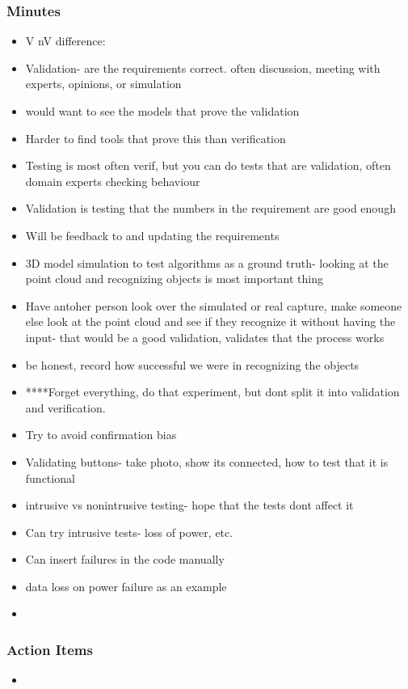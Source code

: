 		\subsubsection*{Minutes}
			\begin{itemize}
				\item V nV difference:
				\item Validation- are the requirements correct. often discussion, meeting with experts, opinions, or simulation
				\item would want to see the models that prove the validation
				\item Harder to find tools that prove this than verification
				\item Testing is most often verif, but you can do tests that are validation, often domain experts checking behaviour
				\item Validation is testing that the numbers in the requirement are good enough 
				\item Will be feedback to and updating the requirements
				\item 3D model simulation to test algorithms as a ground truth- looking at the point cloud and recognizing objects is most important thing
				\item Have antoher person look over the simulated or real capture, make someone else look at the point cloud and see if they recognize it without having the input- that would be a good validation, validates that the process works
				\item be honest, record how successful we were in recognizing the objects
				\item ****Forget everything, do that experiment, but dont split it into validation and verification. 
				\item Try to avoid confirmation bias
				\item Validating buttons- take photo, show its connected, how to test that it is functional
				\item intrusive vs nonintrusive testing- hope that the tests dont affect it
				\item Can try intrusive tests- loss of power, etc. 
				\item Can insert failures in the code manually 
				\item data loss on power failure as an example 
				\item 
			\end{itemize}

		\subsubsection*{Action Items}
			\begin{itemize}
				\item 
			\end{itemize}


